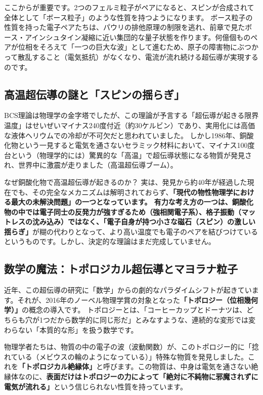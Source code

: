 ここからが重要です。2つのフェルミ粒子がペアになると、スピンが合成されて全体として「ボース粒子」のような性質を持つようになります。 ボース粒子の性質を持った電子ペアたちは、パウリの排他原理の制限を逃れ、前章で見たボース・アインシュタイン凝縮に近い集団的な量子状態を作ります。何億個ものペアが位相をそろえて「一つの巨大な波」として進むため、原子の障害物にぶつかって散乱すること（電気抵抗）がなくなり、電流が流れ続ける超伝導が実現するのです。

\subsection{高温超伝導の謎と「スピンの揺らぎ」}

BCS理論は物理学の金字塔でしたが、この理論が予言する「超伝導が起きる限界温度」はせいぜいマイナス240度付近（約30ケルビン）であり、実用化には高価な液体ヘリウムでの冷却が不可欠だと思われていました。 しかし1986年、銅酸化物という一見すると電気を通さないセラミック材料において、マイナス100度台という（物理学的には）驚異的な「高温」で超伝導状態になる物質が発見され、世界中に激震が走りました（高温超伝導ブーム）。

なぜ銅酸化物で高温超伝導が起きるのか？ 実は、発見から約40年が経過した現在でも、その完全なメカニズムは解明されておらず、\textbf{「現代の物性物理学における最大の未解決問題」の一つとなっています。 有力な考え方の一つは、銅酸化物の中では電子同士の反発力が強すぎるため（強相関電子系）、格子振動（マットレスの沈み込み）ではなく、「電子自身が持つ小さな磁石（スピン）の激しい揺らぎ」}が糊の代わりとなって、より高い温度でも電子のペアを結びつけているというものです。しかし、決定的な理論はまだ完成していません。

\subsection{数学の魔法：トポロジカル超伝導とマヨラナ粒子}

近年、この超伝導の研究に「数学」からの劇的なパラダイムシフトが起きています。それが、2016年のノーベル物理学賞の対象となった\textbf{「トポロジー（位相幾何学）」}の概念の導入です。 トポロジーとは、「コーヒーカップとドーナツは、どちらも穴が1つだから数学的に同じ形だ」とみなすような、連続的な変形では変わらない「本質的な形」を扱う数学です。

物理学者たちは、物質の中の電子の波（波動関数）が、このトポロジー的に「捻れている（メビウスの輪のようになっている）」特殊な物質を発見しました。これを\textbf{「トポロジカル絶縁体」}と呼びます。この物質は、中身は電気を通さない絶縁体なのに、\textbf{表面だけはトポロジーの力によって「絶対に不純物に邪魔されずに電気が流れる」}という信じられない性質を持っています。

